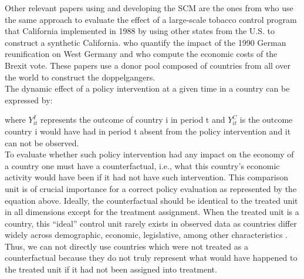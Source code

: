 \documentclass[11pt, a4paper, leqno]{article}
\begin{document}
Other relevant papers using and developing the SCM are the ones from \citet{Abadie2010} who use the same approach to evaluate the effect of a large-scale tobacco control program that California implemented in 1988 by using other states from the U.S. to construct a synthetic California. \citet{Abadie2015} who quantify the impact of the 1990 German reunification on West Germany and \citet{Born2018} who compute the economic costs of the Brexit vote. These papers use a donor pool composed of countries from all over the world to construct the doppelgangers. \\

The dynamic effect of a policy intervention at a given time in a country can be expressed by: 

where $Y_{it}^I$ represents the outcome of country i in period t and $Y_{it}^C$ is the outcome country i would have had in period t absent from the policy intervention and it can not be observed. \\

To evaluate whether such policy intervention had any impact on the economy of a country one must have a counterfactual, i.e., what this country's economic activity would have been if it had not have such intervention. This comparison unit is of crucial importance for a correct policy evaluation as represented by the equation above. Ideally, the counterfactual should be identical to the treated unit in all dimensions except for the treatment assignment. When the treated unit is a country, this ``ideal'' control unit rarely exists in observed data as countries differ widely across demographic, economic, legislative, among other characteristics \citet{Born2018}. Thus, we can not directly use countries which were not treated as a counterfactual because they do not truly represent what would have happened to the treated unit if it had not been assigned into treatment. \\
\end{document}
